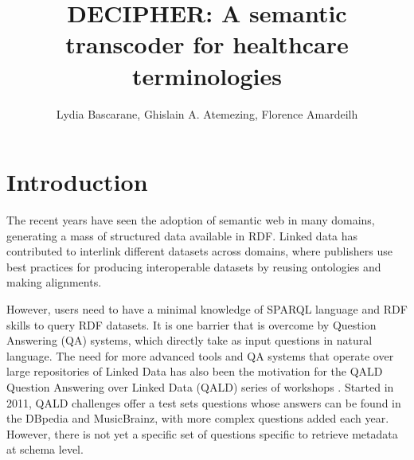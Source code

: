 \documentclass[runningheads,a4paper]{llncs}
\begin{document}
\title{DECIPHER: A semantic transcoder for healthcare terminologies}

\author{Lydia Bascarane, Ghislain A. Atemezing, Florence Amardeilh }


\maketitle



\begin{abstract}



\end{abstract}




\section{Introduction}
\label{sec:introduction}
The recent years have seen the adoption of semantic web in many domains, generating a mass of structured data available in RDF. Linked data has contributed to interlink different datasets across domains, where publishers use best practices for producing interoperable datasets by reusing ontologies and making alignments. 

However, users need to have a minimal knowledge of SPARQL language and RDF skills to query  RDF datasets. It is one barrier that is overcome by Question Answering (QA) systems, which directly take as input questions in natural language. The need for more advanced tools and QA systems that operate over large repositories of Linked Data has also been the motivation for the QALD Question Answering over Linked Data (QALD) series of workshops \cite{lopezetal2013}. Started in 2011, QALD challenges offer a test sets questions whose answers can be found in the DBpedia and MusicBrainz, with more complex questions added each year. However, there is not yet a specific set of questions specific to retrieve metadata at schema level.
 
\end{document}
